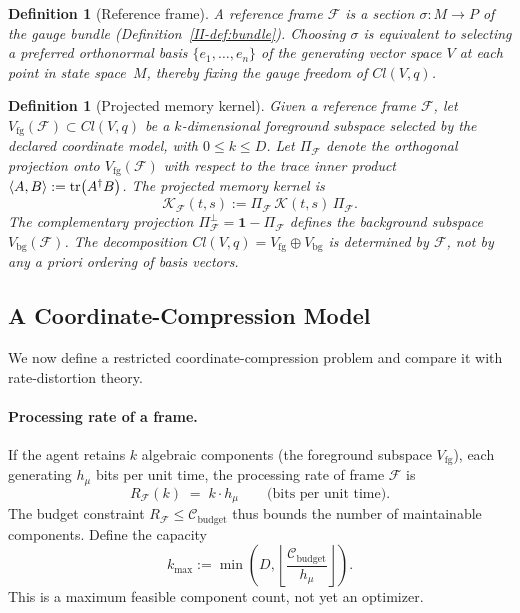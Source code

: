 \documentclass[12pt,a4paper,openany]{book}
\newtheorem{definition}[theorem]{Definition}
\begin{document}
\begin{definition}[Reference frame]
\label{II-def:frame}
A \emph{reference frame} $\mathcal{F}$ is a section
$\sigma: M \to P$ of the gauge bundle
(Definition~\ref{II-def:bundle}).
Choosing $\sigma$ is equivalent to selecting a preferred
orthonormal basis $\{e_1, \ldots, e_n\}$ of the generating
vector space $V$ at each point in state space~$M$, thereby
fixing the gauge freedom of $Cl(V,q)$.
\end{definition}

\begin{definition}[Projected memory kernel]
\label{II-def:projected}
Given a reference frame $\mathcal{F}$, let
$V_{\mathrm{fg}}(\mathcal{F}) \subset Cl(V,q)$ be a
$k$-dimensional \emph{foreground subspace} selected by the declared
coordinate model, with $0\leq k\leq D$.
Let $\Pi_{\mathcal{F}}$ denote the orthogonal projection
onto $V_{\mathrm{fg}}(\mathcal{F})$ with respect to the
trace inner product
$\langle A, B \rangle := \tr(A^\dagger B)$.
The \emph{projected memory kernel} is
\begin{equation}
\label{II-eq:projected_kernel}
\mathcal{K}_{\mathcal{F}}(t,s)
:= \Pi_{\mathcal{F}}\,\mathcal{K}(t,s)\,
   \Pi_{\mathcal{F}}.
\end{equation}
The complementary projection
$\Pi_{\mathcal{F}}^{\perp}
= \mathbf{1} - \Pi_{\mathcal{F}}$ defines the
\emph{background subspace} $V_{\mathrm{bg}}(\mathcal{F})$.
The decomposition
$Cl(V,q) = V_{\mathrm{fg}} \oplus V_{\mathrm{bg}}$
is determined by $\mathcal{F}$, not by any \emph{a priori}
ordering of basis vectors.
\end{definition}

\subsection{A Coordinate-Compression Model}
\label{II-subsec:RD_bound}

We now define a restricted coordinate-compression problem and compare it
with rate-distortion theory.

\paragraph{Processing rate of a frame.}
If the agent retains $k$ algebraic components (the foreground
subspace $V_{\mathrm{fg}}$), each generating $h_\mu$ bits
per unit time, the processing rate of frame $\mathcal{F}$ is
\begin{equation}
\label{II-eq:R_frame}
R_{\mathcal{F}}(k) \;=\; k \cdot h_\mu
\qquad\text{(bits per unit time)}.
\end{equation}
The budget constraint $R_{\mathcal{F}} \leq
\mathcal{C}_{\mathrm{budget}}$ thus bounds the number of
maintainable components.
Define the capacity
\begin{equation}
k_{\max}:=\min\!\left(D,
\left\lfloor\frac{\mathcal C_{\mathrm{budget}}}{h_\mu}\right\rfloor
\right).
\end{equation}
This is a maximum feasible component count, not yet an optimizer.
\end{document}
